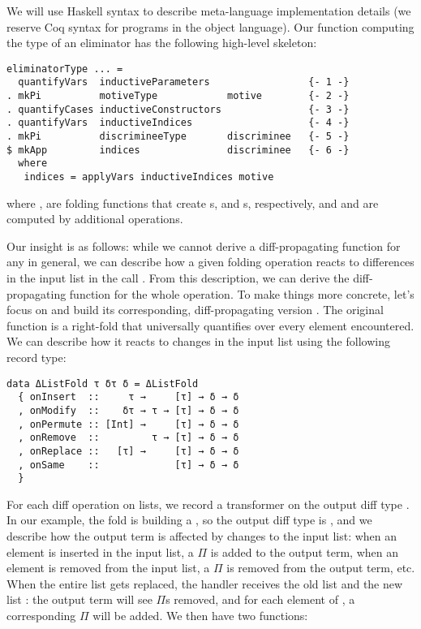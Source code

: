 %
We will use Haskell syntax to describe meta-language implementation details (we
reserve Coq syntax for programs in the object language).  Our function computing
the type of an eliminator has the following high-level skeleton:

\begin{verbatim}
eliminatorType ... =
  quantifyVars  inductiveParameters                 {- 1 -}
. mkPi          motiveType            motive        {- 2 -}
. quantifyCases inductiveConstructors               {- 3 -}
. quantifyVars  inductiveIndices                    {- 4 -}
. mkPi          discrimineeType       discriminee   {- 5 -}
$ mkApp         indices               discriminee   {- 6 -}
  where
   indices = applyVars inductiveIndices motive
\end{verbatim}

\noindent where ,  are
folding functions that create s, and s,
respectively, and  and  are
computed by additional  operations.

Our insight is as follows: while we cannot derive a diff-propagating function
for any  in general, we can describe how a given folding
operation  reacts to differences in the input list  in
the call .  From this description, we can derive the
diff-propagating function for the whole  operation.  To make
things more concrete, let's focus on  and build
its corresponding, diff-propagating version .
The original function is a right-fold that universally quantifies over every
element encountered. We can describe how it reacts to changes in the input list
using the following record type:

\begin{verbatim}
data ΔListFold τ δτ δ = ΔListFold
  { onInsert  ::     τ →     [τ] → δ → δ
  , onModify  ::    δτ → τ → [τ] → δ → δ
  , onPermute :: [Int] →     [τ] → δ → δ
  , onRemove  ::         τ → [τ] → δ → δ
  , onReplace ::   [τ] →     [τ] → δ → δ
  , onSame    ::             [τ] → δ → δ
  }
\end{verbatim}

\noindent For each diff operation on lists, we record a transformer on the
output diff type .  In our example, the fold is building a
, so the output diff type is , and we describe
how the output term is affected by changes to the input list: when an element is
inserted in the input list, a $\Pi$ is added to the output term, when an element
is removed from the input list, a $\Pi$ is removed from the output term, etc.
When the entire list gets replaced, the handler receives the old list
 and the new list : the output term will see
 $\Pi$s removed, and for each element of , a
corresponding $\Pi$ will be added.  We then have two functions:


